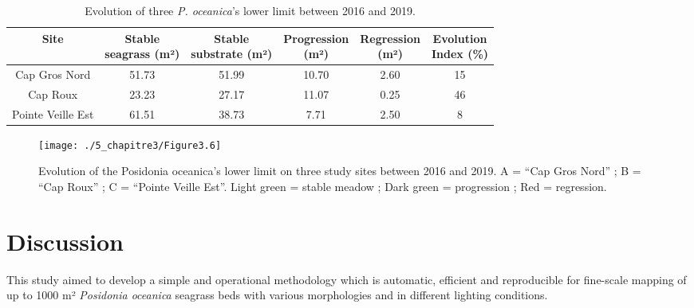 \begin{table}[htbp]
  \centering
  \normalsize
  \caption[Evolution of three \textit{P. oceanica}’s lower limit between 2016 and 2019.]{Evolution of three \textit{P. oceanica}’s lower limit between 2016 and 2019.}
  \label{table3.3}
    \begin{tabular}{*{6}{c}}
        \toprule
        \textbf{Site} & \makecell{\textbf{Stable} \\ \textbf{seagrass (m²)}} & \makecell{\textbf{Stable} \\ \textbf{substrate (m²)}} & \makecell{\textbf{Progression} \\ \textbf{(m²)}} & \makecell{\textbf{Regression} \\ \textbf{(m²)}} & \makecell{\textbf{Evolution} \\ \textbf{Index (\%)}} \\ \midrule
        Cap   Gros Nord & 51.73 & 51.99 & 10.70 & 2.60 & 15 \\
        Cap   Roux & 23.23 & 27.17 & 11.07 & 0.25 & 46 \\
        Pointe   Veille Est & 61.51 & 38.73 & 7.71 & 2.50 & 8 \\ \bottomrule
    \end{tabular}
\end{table}

\begin{figure}[H]
	\begin{center}
	\texttt{[image: ./5\_chapitre3/Figure3.6]}
		\caption[Evolution of the Posidonia oceanica’s lower limit on three study sites between 2016 and 2019.]{Evolution of the Posidonia oceanica’s lower limit on three study sites between 2016 and 2019. A = “Cap Gros Nord” ; B = “Cap Roux” ; C = “Pointe Veille Est”. Light green = stable meadow ; Dark green = progression ; Red = regression.}
	\label{figure3.6}
\end{center}
\end{figure}

\newpage

\section{Discussion}\label{chapitre3_4}
This study aimed to develop a simple and operational methodology which is automatic, efficient and reproducible for fine-scale mapping of up to 1000 m² \textit{Posidonia oceanica} seagrass beds with various morphologies and in different lighting conditions.

